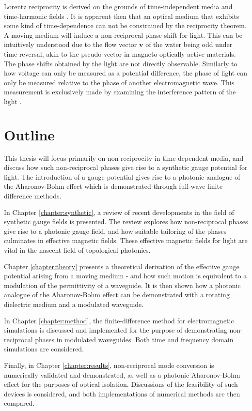 Lorentz reciprocity is derived on the grounds of time-independent media and time-harmonic fields \cite{Caloz2016}. It is apparent then that an optical medium that exhibits some kind of time-dependence can not be constrained by the reciprocity theorem. A moving medium will induce a non-reciprocal phase shift for light. This can be intuitively understood due to the flow vector $\bm{v}$ of the water being odd under time-reversal, akin to the pseudo-vector in magneto-optically active materials. The phase shifts obtained by the light are not directly observable. Similarly to how voltage can only be measured as a potential difference, the phase of light can only be measured relative to the phase of another electromagnetic wave. This measurement is exclusively made by examining the interference pattern of the light \cite{Tzuang2014a}.

\section{Outline}
This thesis will focus primarily on non-reciprocity in time-dependent media, and discuss how such non-reciprocal phases give rise to a synthetic gauge potential for light. The introduction of a gauge potential gives rise to a photonic analogue of the Aharonov-Bohm effect which is demonstrated through full-wave finite difference methods. 

In Chapter \ref{chapter:synthetic}, a review of recent developments in the field of synthetic gauge fields is presented. The review explores how non-reciprocal phases give rise to a photonic gauge field, and how suitable tailoring of the phases culminates in effective magnetic fields. These effective magnetic fields for light are vital in the nascent field of topological photonics. 

Chapter \ref{chapter:theory} presents a theoretical derivation of the effective gauge potential arising from a moving medium - and how such motion is equivalent to a modulation of the permittivity of a waveguide. It is then shown how a photonic analogue of the Aharonov-Bohm effect can be demonstrated with a rotating dielectric medium and a modulated waveguide. 

In Chapter \ref{chapter:method}, the finite-difference method for electromagnetic simulations is discussed and implemented for the purpose of demonstrating non-reciprocal phases in modulated waveguides. Both time and frequency domain simulations are considered.

Finally, in Chapter \ref{chapter:results}, non-reciprocal mode conversion is numerically validated and demonstrated, as well as a photonic Aharonov-Bohm effect for the purposes of optical isolation. Discussions of the feasibility of such devices is considered, and both implementations of numerical methods are then compared.